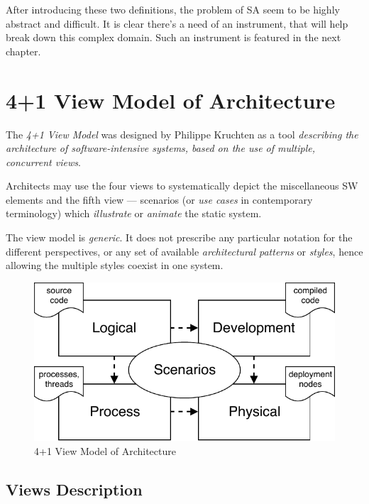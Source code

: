 \documentclass[thesis=M,english,hidelinks]{FITthesis}[2012/10/20]
\begin{document}
After introducing these two definitions, the problem of \acrshort{SA} seem to be highly abstract and difficult. It is clear there's a need of an instrument, that will help break down this complex domain. Such an instrument is featured in the next chapter.

% 
% 
\section{4+1 View Model of Architecture}
The \textit{4+1 View Model} was designed by Philippe Kruchten as a tool \textit{describing the architecture of software-intensive systems, based on the use of multiple, concurrent views}.~\cite{arch-41-views}

Architects may use the four views to systematically depict the miscellaneous \acrshort{SW} elements and the fifth view --- scenarios (or \textit{use cases} in contemporary terminology) which \textit{illustrate} or \textit{animate} the static system.

The view model is \textit{generic}. It does not prescribe any particular notation for the different perspectives, or any set of available \textit{architectural patterns} or \textit{styles}, hence allowing the multiple styles coexist in one system.

\begin{figure}
  \centering
    \includegraphics{images/4+1_view.pdf}
    \caption{4+1 View Model of Architecture}
    \label{fig:arch-41-view}
\end{figure}

\subsection{Views Description}
\label{sec:41-views-description}
\end{document}
